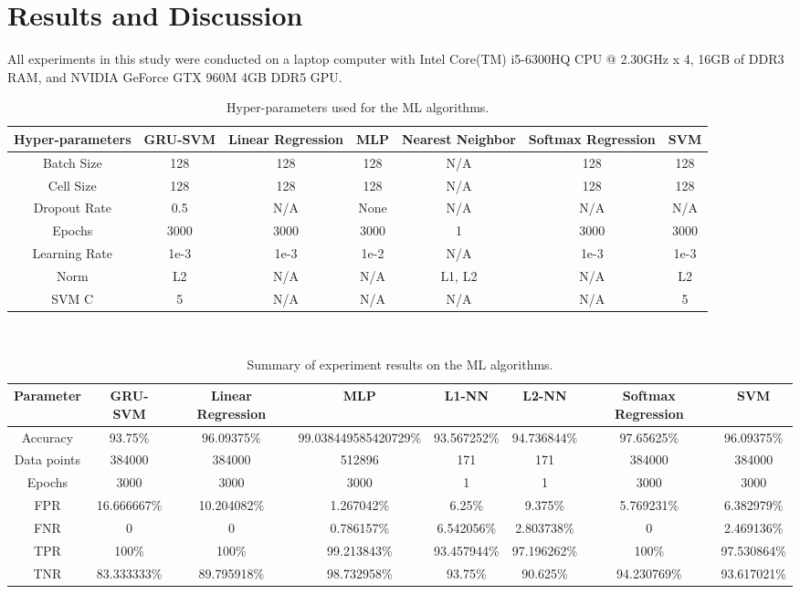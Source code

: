 \section{Results and Discussion}
All experiments in this study were conducted on a laptop computer with Intel Core(TM) i5-6300HQ CPU @ 2.30GHz x 4, 16GB of DDR3 RAM, and NVIDIA GeForce GTX 960M 4GB DDR5 GPU.
\begin{table}
\centering
\caption{Hyper-parameters used for the ML algorithms.}
		\begin{tabular}{ccccccc}
		\toprule
		Hyper-parameters & GRU-SVM & Linear Regression & MLP & Nearest Neighbor & Softmax Regression & SVM \\
		\midrule
		Batch Size & 128 & 128 & 128 & N/A & 128 & 128 \\
		Cell Size & 128 & 128 & 128 & N/A & 128 & 128 \\
		Dropout Rate & 0.5 & N/A & None & N/A & N/A & N/A\\
		Epochs & 3000 & 3000 & 3000 & 1 & 3000 & 3000\\
		Learning Rate & 1e-3 & 1e-3 & 1e-2 & N/A & 1e-3 & 1e-3\\
		Norm & L2 & N/A & N/A & L1, L2 & N/A & L2\\
		SVM C & 5 & N/A & N/A & N/A & N/A & 5\\
		\bottomrule
		\end{tabular}\\
		\label{table: hyperparameters}
\end{table}
\begin{table}
\centering
\caption{Summary of experiment results on the ML algorithms.}
		\begin{tabular}{cccccccc}
		\toprule
		Parameter & GRU-SVM & Linear Regression & MLP & L1-NN & L2-NN & Softmax Regression & SVM \\
		\midrule
		Accuracy & 93.75\% & 96.09375\% & 99.038449585420729\% & 93.567252\% & 94.736844\% & 97.65625\% & 96.09375\% \\
		Data points  & 384000 & 384000 & 512896 & 171 & 171 & 384000 & 384000 \\
		Epochs & 3000 & 3000 & 3000 & 1 & 1 & 3000 & 3000\\
		FPR & 16.666667\% & 10.204082\% & 1.267042\% & 6.25\% & 9.375\% & 5.769231\% & 6.382979\% \\
		FNR & 0 & 0 & 0.786157\% & 6.542056\% & 2.803738\%& 0 & 2.469136\% \\
		TPR & 100\% & 100\% & 99.213843\% & 93.457944\% & 97.196262\% & 100\% & 97.530864\% \\
		TNR & 83.333333\% & 89.795918\% & 98.732958\% & 93.75\% & 90.625\% & 94.230769\% & 93.617021\% \\
		\bottomrule
		\end{tabular}\\
		\label{table: summary-results}
\end{table}

